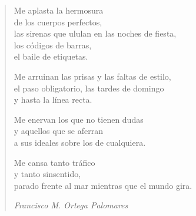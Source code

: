 \begin{verse}
\begin{center}
\par

Me aplasta la hermosura \\

de los cuerpos perfectos, \\

las sirenas que ululan en las noches de fiesta, \\

los códigos de barras, \\

el baile de etiquetas.

\par

Me arruinan las prisas y las faltas de estilo, \\

el paso obligatorio, las tardes de domingo \\

y hasta la línea recta.

\par

Me enervan los que no tienen dudas \\

y aquellos que se aferran \\

a sus ideales sobre los de cualquiera.



Me cansa tanto tráfico \\

y tanto sinsentido, \\

parado frente al mar mientras que el mundo gira.

\par{\it Francisco M. Ortega Palomares}

\end{center}

\end{verse}           